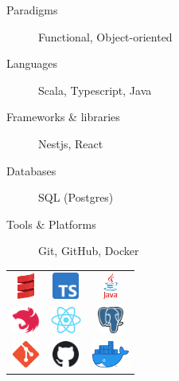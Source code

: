 \begin{MainPart}
  \begin{minipage}{0.55\textwidth}
    \begin{description}
      \item[Paradigms] Functional, Object-oriented
      \item[Languages] Scala, Typescript, Java
      \item[Frameworks \& libraries] Nestjs, React
      \item[Databases] SQL (Postgres)
      \item[Tools \& Platforms] Git, GitHub, Docker
    \end{description}
  \end{minipage}
  \hfill
  \begin{minipage}{0.40\linewidth}
    \begin{tabular}{ccc}
      \includegraphics[height=25pt]{img/scala-spiral.png} & \includegraphics[height=25pt]{img/typescript.png} & \includegraphics[height=25pt]{img/java.png}       \\
      \includegraphics[height=25pt]{img/nestjs.png}       & \includegraphics[height=25pt]{img/react.png}      & \includegraphics[height=25pt]{img/postgresql.png} \\
      \includegraphics[height=25pt]{img/git.png}          & \includegraphics[height=25pt]{img/github.png}     & \includegraphics[height=25pt]{img/docker.png}
    \end{tabular}
  \end{minipage}
  \vspace{0.3cm}


\end{MainPart}
